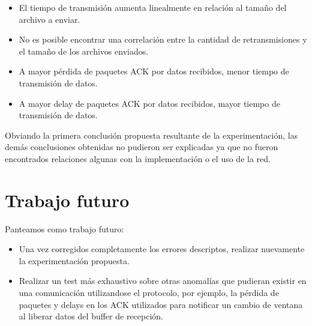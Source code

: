 \documentclass[a4paper, 10pt, twoside]{article}
\begin{document}
\begin{itemize}
  \item El tiempo de transmisión aumenta linealmente en relación al tamaño del archivo a enviar.
  \item No es posible encontrar una correlación entre la cantidad de retransmisiones y el tamaño de los archivos enviados.
  \item A mayor pérdida de paquetes ACK por datos recibidos, menor tiempo de transmisión de datos.
  \item A mayor delay de paquetes ACK por datos recibidos, mayor tiempo de transmisión de datos.
\end{itemize}

Obviando la primera conclusión propuesta resultante de la experimentación, las demás conclusiones obtenidas no pudieron ser explicadas ya que no fueron encontrados relaciones algunas con la implementación o el uso de la red.



\section{Trabajo futuro}

Panteamos como trabajo futuro:
\begin{itemize}
\item Una vez corregidos completamente los errores descriptos, realizar nuevamente la experimentación propuesta.
\item Realizar un test más exhaustivo sobre otras anomalías que pudieran existir en una comunicación utilizandose el protocolo, por ejemplo, la pérdida de paquetes y delays en los ACK utilizados para notificar un cambio de ventana al liberar datos del buffer de recepción.
\end{itemize}



\begin{thebibliography}{9}


\end{thebibliography}
\end{document}
